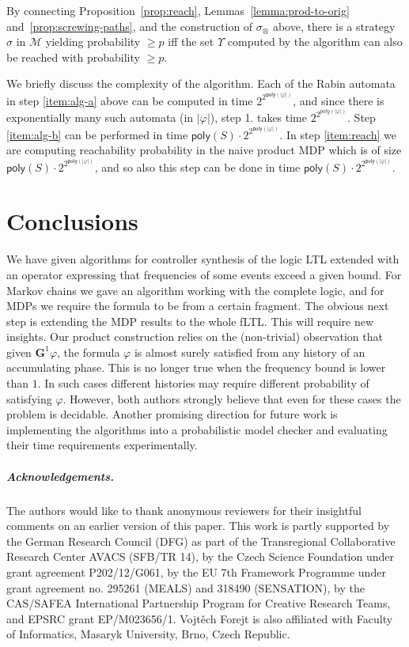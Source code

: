 \documentclass[a4paper,UKenglish]{lipics}
\newcommand{\poly}[1]{\mathsf{poly}(#1)}
\newcommand{\mdp}{\mathcal{M}}
\newcommand{\Gf}[1]{\mathbf{G}^{#1}}
\begin{document}
\noindent
By connecting Proposition~\ref{prop:reach}, Lemmas~\ref{lemma:prod-to-orig} and~\ref{prop:screwing-paths}, and the construction of $\sigma_\otimes$ above, there is a strategy $\sigma$ in $\mdp$ yielding probability $\geq p$ iff the set $\Upsilon$ computed by the algorithm can also be reached with probability $\geq p$.

We briefly discuss the complexity of the algorithm. Each of the Rabin automata in step \ref{item:alg-a} above can be computed in time $2^{2^{\poly{|\varphi|}}}$,
and since there is exponentially many such automata (in $|\varphi|$), step 1. takes time $2^{2^{poly(|\varphi|)}}$.
Step \ref{item:alg-b} can be performed in time $\poly{S}\cdot 2^{2^{\poly{|\varphi|}}}$.
In step \ref{item:reach} we are computing reachability probability in the naive product MDP which is of size $\poly{S} \cdot 2^{2^{\poly{|\varphi|}}}$,
and so also this step can be done in time $\poly{S}\cdot 2^{2^{\poly{|\varphi|}}}$.




\section{Conclusions}

We have given algorithms for controller synthesis of the logic LTL extended with
an operator expressing that frequencies of some events exceed a given bound.
For Markov chains we gave an algorithm working with the complete logic, and for
MDPs we require the formula to be from a certain fragment.
The obvious next step is extending the MDP results to the whole fLTL.
This will require new insights. Our product construction relies on the (non-trivial) observation
that given $\Gf{1}\varphi$, the formula $\varphi$ is almost surely satisfied from
any history of an accumulating phase. This is no longer true when the frequency bound is
lower than $1$. In such cases different histories may require different probability of
satisfying $\varphi$. However, both authors strongly believe that even for these cases the problem
is decidable.
Another promising direction for future work is implementing the algorithms into a probabilistic model checker and evaluating their time requirements experimentally.

\subparagraph{Acknowledgements.} The authors would like to thank anonymous reviewers for their insightful comments on an earlier version of this paper. 
This work is partly supported by the German Research Council (DFG) as part of the Transregional Collaborative Research Center AVACS (SFB/TR 14), by the Czech Science Foundation under grant agreement P202/12/G061, by the EU 7th Framework Programme under grant agreement no. 295261 (MEALS) and 318490 (SENSATION), by the CAS/SAFEA International Partnership Program for Creative Research Teams, and EPSRC grant EP/M023656/1. Vojt\v{e}ch Forejt is also affiliated with Faculty of Informatics, Masaryk University, Brno, Czech Republic.
\end{document}
